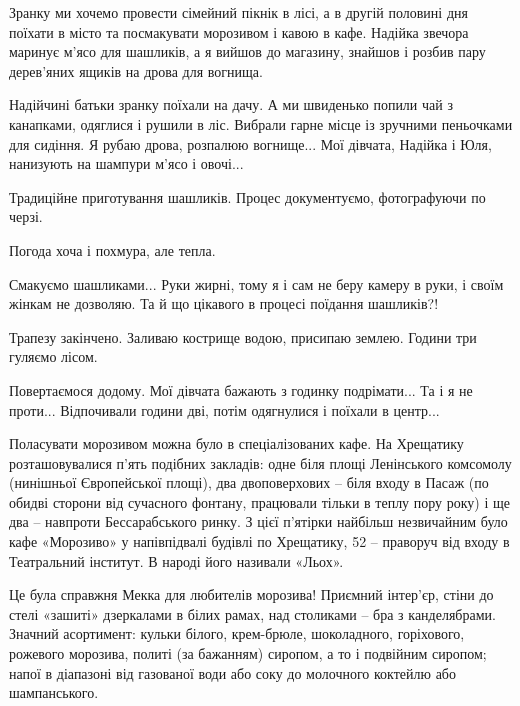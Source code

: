 
Зранку ми хочемо провести сімейний пікнік в лісі, а в другій половині дня
поїхати в місто та посмакувати морозивом і кавою в кафе. Надійка звечора
маринує м’ясо для шашликів, а я вийшов до магазину, знайшов і розбив пару
дерев’яних ящиків на дрова для вогнища. 


Надійчині батьки зранку поїхали на дачу. А ми швиденько попили чай з канапками,
одяглися і рушили в ліс. Вибрали гарне місце із зручними пеньочками для
сидіння. Я рубаю дрова, розпалюю вогнище... Мої дівчата, Надійка і Юля, нанизують
на шампури м’ясо і овочі...


Традиційне приготування шашликів. Процес документуємо, фотографуючи по черзі.

Погода хоча і похмура, але тепла. 

Смакуємо шашликами... Руки жирні, тому я і сам не беру камеру в руки, і своїм
жінкам не дозволяю. Та й що цікавого в процесі поїдання шашликів?!

Трапезу закінчено. Заливаю кострище водою, присипаю землею. Години три гуляємо
лісом.


Повертаємося додому. Мої дівчата бажають з годинку подрімати... Та і я не проти...
Відпочивали години дві, потім одягнулися і поїхали в центр... 

Поласувати морозивом можна було в спеціалізованих кафе. На Хрещатику
розташовувалися п'ять подібних закладів: одне біля площі Ленінського комсомолу
(нинішньої Європейської площі), два двоповерхових – біля входу в Пасаж (по
обидві сторони від сучасного фонтану, працювали тільки в теплу пору року) і ще
два – навпроти Бессарабського ринку. З цієї п'ятірки найбільш незвичайним було
кафе «Морозиво» у напівпідвалі будівлі по Хрещатику, 52 – праворуч від входу в
Театральний інститут. В народі його називали «Льох».

Це була справжня Мекка для любителів морозива! Приємний інтер'єр, стіни до
стелі «зашиті» дзеркалами в білих рамах, над столиками – бра з канделябрами.
Значний асортимент: кульки білого, крем-брюле, шоколадного, горіхового,
рожевого морозива, политі (за бажанням) сиропом, а то і подвійним сиропом;
напої в діапазоні від газованої води або соку до молочного коктейлю або
шампанського. 

